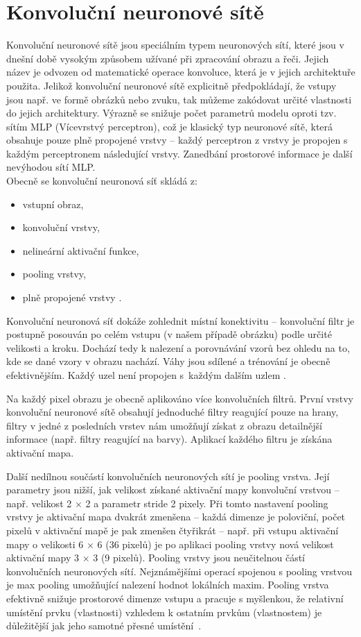 \section{Konvoluční neuronové sítě}
Konvoluční neuronové sítě jsou speciálním typem neuronových sítí, které jsou v dnešní době vysokým způsobem užívané při zpracování obrazu a řeči. Jejich název je odvozen od matematické operace konvoluce, která je v jejich architektuře použita. Jelikož konvoluční neuronové sítě explicitně předpokládají, že vstupy jsou např. ve formě obrázků nebo zvuku, tak můžeme zakódovat určité vlastnosti do jejich architektury. Výrazně se snižuje počet parametrů modelu oproti tzv. sítím MLP (Vícevrstvý perceptron), což je klasický typ neuronové sítě, která obsahuje pouze plně propojené vrstvy -- každý perceptron z vrstvy je propojen s každým perceptronem následující vrstvy. Zanedbání prostorové informace je další nevýhodou sítí MLP.\\

Obecně se konvoluční neuronová síť skládá z:
\begin{itemize}
    \item vstupní obraz,
    \item konvoluční vrstvy,
    \item nelineární aktivační funkce,
    \item pooling vrstvy,
    \item plně propojené vrstvy \cite{PoolingLayers}.
\end{itemize}

Konvoluční neuronová síť dokáže zohlednit místní konektivitu -- konvoluční filtr je postupně posouván po celém vstupu (v našem případě obrázku) podle určité velikosti a kroku. Dochází tedy k nalezení a porovnávání vzorů bez ohledu na to, kde se dané vzory v obrazu nachází. Váhy jsou sdílené a trénování je obecně efektivnějším. Každý uzel není propojen s~každým dalším uzlem \cite{CNNvsMLP}.

Na každý pixel obrazu je obecně aplikováno více konvolučních filtrů. První vrstvy konvoluční neuronové sítě obsahují jednoduché filtry reagující pouze na hrany, filtry v jedné z posledních vrstev nám umožňují získat z obrazu detailnější informace (např. filtry reagující na barvy). Aplikací každého filtru je získána aktivační mapa. 

Další nedílnou součástí konvolučních neuronových sítí je pooling vrstva. Její parametry jsou nižší, jak velikost získané aktivační mapy konvoluční vrstvou -- např. velikost 2 $\times$ 2 a parametr stride 2 pixely. Při tomto nastavení pooling vrstvy je aktivační mapa dvakrát zmenšena -- každá dimenze je poloviční, počet pixelů v aktivační mapě je pak zmenšen čtyřikrát -- např. při vstupu aktivační mapy o velikosti 6 $\times$ 6 (36 pixelů) je po aplikaci pooling vrstvy nová velikost aktivační mapy 3 $\times$ 3 (9 pixelů). Pooling vrstvy jsou neučitelnou částí konvolučních neuronových sítí. Nejznámějšími operací spojenou s pooling vrstvou je max pooling umožňující nalezení hodnot lokálních maxim. Pooling vrstva efektivně snižuje prostorové dimenze vstupu a pracuje s myšlenkou, že relativní umístění prvku (vlastnosti) vzhledem k ostatním prvkům (vlastnostem) je důležitější jak jeho samotné přesné umístění~\cite{PoolingLayers}.

